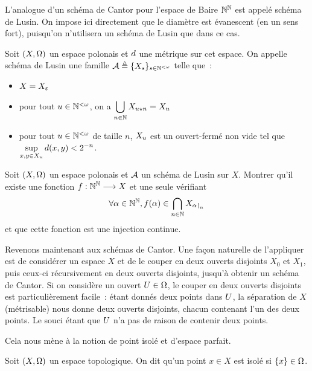 L'analogue d'un schéma de Cantor pour l'espace de Baire $\mathbb N^\mathbb N$ est appelé
schéma de Lusin. On impose ici directement que le diamètre est évanescent (en un
sens fort), puisqu'on n'utilisera un schéma de Lusin que dans ce cas.

\begin{definition}
  Soit $(X,\Omega)$ un espace polonais et $d$ une métrique sur cet espace.
  On appelle schéma de Lusin une famille $\mathcal A \triangleq \{X_s\}_{s\in \mathbb N^{<\omega}}$
  telle que~:
  \begin{itemize}
  \item $X = X_{\varepsilon}$
  \item pour tout $u\in \mathbb N^{<\omega}$, on a
    $\displaystyle \bigcup_{n\in\mathbb N} X_{u\mathbin{\star} n} = X_u$
  \item pour tout $u\in\mathbb N^{<\omega}$ de taille $n$, $X_u$ est un
    ouvert-fermé non vide tel que
    $\displaystyle\sup_{x,y\in X_u} d(x,y) < 2^{-n}$.
  \end{itemize}
\end{definition}

\begin{exercise}\label{exo.Lusin.inj}
  Soit $(X,\Omega)$ un espace polonais et $\mathcal A$ un schéma de Lusin sur $X$.
  Montrer qu'il existe une fonction $f : \displaystyle \mathbb N^\mathbb N \longrightarrow X$
  et une seule vérifiant
  \[\forall \alpha \in \mathbb N^\mathbb N, f(\alpha) \in
  \bigcap_{n \in \mathbb N} X_{\alpha\mathbin{\upharpoonright}_{n}}\]
  et que cette fonction est une injection continue.
\end{exercise}

Revenons maintenant aux schémas de Cantor. Une façon naturelle de l'appliquer
est de considérer un espace $X$ et de le couper en deux ouverts disjoints
$X_0$ et $X_1$, puis ceux-ci récursivement en deux ouverts disjoints, jusqu'à
obtenir un schéma de Cantor. Si on considère un ouvert $U\in \Omega$, le
couper en deux ouverts disjoints est particulièrement facile~: étant donnés deux
points dans $U$, la séparation de $X$ (métrisable) nous donne deux ouverts
disjoints, chacun contenant l'un des deux points. Le souci étant que $U$
n'a pas de raison de contenir deux points.

Cela nous mène à la notion de point isolé et d'espace parfait.

\begin{definition}
  Soit $(X,\Omega)$ un espace topologique. On dit qu'un point $x\in X$ est isolé
  si $\{x\}\in\Omega$.
\end{definition}

